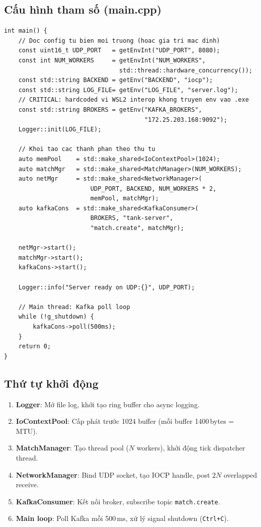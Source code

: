 \documentclass[12pt,a4paper]{report}
\begin{document}
\subsection{Cấu hình tham số (main.cpp)}

\begin{lstlisting}[style=cppStyle, caption={Đọc cấu hình và khởi động server}, label={lst:serverconfig}]
int main() {
    // Doc config tu bien moi truong (hoac gia tri mac dinh)
    const uint16_t UDP_PORT   = getEnvInt("UDP_PORT", 8080);
    const int NUM_WORKERS     = getEnvInt("NUM_WORKERS",
                                std::thread::hardware_concurrency());
    const std::string BACKEND = getEnv("BACKEND", "iocp");
    const std::string LOG_FILE= getEnv("LOG_FILE", "server.log");
    // CRITICAL: hardcoded vi WSL2 interop khong truyen env vao .exe
    const std::string BROKERS = getEnv("KAFKA_BROKERS",
                                       "172.25.203.168:9092");
    Logger::init(LOG_FILE);

    // Khoi tao cac thanh phan theo thu tu
    auto memPool    = std::make_shared<IoContextPool>(1024);
    auto matchMgr   = std::make_shared<MatchManager>(NUM_WORKERS);
    auto netMgr     = std::make_shared<NetworkManager>(
                        UDP_PORT, BACKEND, NUM_WORKERS * 2,
                        memPool, matchMgr);
    auto kafkaCons  = std::make_shared<KafkaConsumer>(
                        BROKERS, "tank-server",
                        "match.create", matchMgr);

    netMgr->start();
    matchMgr->start();
    kafkaCons->start();

    Logger::info("Server ready on UDP:{}", UDP_PORT);

    // Main thread: Kafka poll loop
    while (!g_shutdown) {
        kafkaCons->poll(500ms);
    }
    return 0;
}
\end{lstlisting}

\subsection{Thứ tự khởi động}

\begin{enumerate}
  \item \textbf{Logger}: Mở file log, khởi tạo ring buffer cho async logging.
  \item \textbf{IoContextPool}: Cấp phát trước 1024 buffer (mỗi buffer 1400\,bytes = MTU).
  \item \textbf{MatchManager}: Tạo thread pool ($N$ workers), khởi động tick dispatcher thread.
  \item \textbf{NetworkManager}: Bind UDP socket, tạo IOCP handle, post $2N$ overlapped receive.
  \item \textbf{KafkaConsumer}: Kết nối broker, subscribe topic \texttt{match.create}.
  \item \textbf{Main loop}: Poll Kafka mỗi 500\,ms, xử lý signal shutdown (\texttt{Ctrl+C}).
\end{enumerate}
\end{document}
